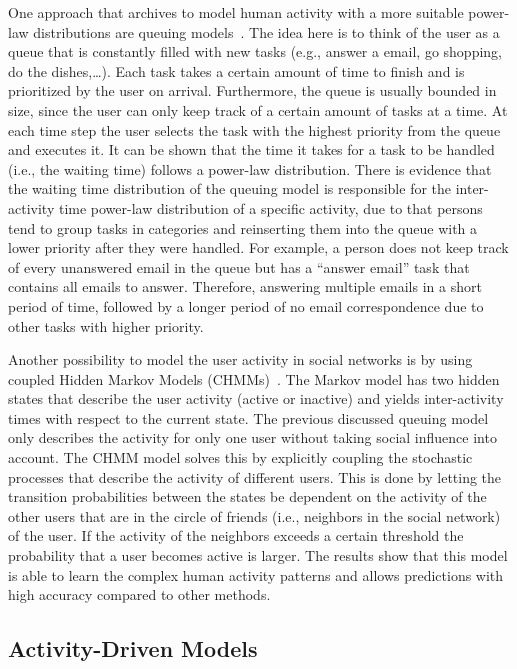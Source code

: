 One approach that archives to model human activity with a more suitable power-law distributions are queuing models~\cite{Vazquez2006}.
The idea here is to think of the user as a queue that is constantly filled with new tasks (e.g., answer a email, go shopping, do the dishes,\ldots).
Each task takes a certain amount of time to finish and is prioritized by the user on arrival.
Furthermore, the queue is usually bounded in size, since the user can only keep track of a certain amount of tasks at a time.
At each time step the user selects the task with the highest priority from the queue and executes it.
It can be shown that the time it takes for a task to be handled (i.e., the waiting time) follows a power-law distribution.
There is evidence that the waiting time distribution of the queuing model is responsible for the inter-activity time power-law distribution of a specific activity, due to that persons tend to group tasks in categories and reinserting them into the queue with a lower priority after they were handled.
For example, a person does not keep track of every unanswered email in the queue but has a \enquote{answer email} task that contains all emails to answer.
Therefore, answering multiple emails in a short period of time, followed by a longer period of no email correspondence due to other tasks with higher priority.

Another possibility to model the user activity in social networks is by using coupled Hidden Markov Models (CHMMs)~\cite{Raghavan2013}.
The Markov model has two hidden states that describe the user activity (active or inactive) and yields inter-activity times with respect to the current state.
The previous discussed queuing model only describes the activity for only one user without taking social influence into account.
   The CHMM model solves this by explicitly coupling the stochastic processes that describe the activity of different users.
   This is done by letting the transition probabilities between the states be dependent on the activity of the other users that are in the circle of friends (i.e., neighbors in the social network) of the user.
If the activity of the neighbors exceeds a certain threshold the probability that a user becomes active is larger.
The results show that this model is able to learn the complex human activity patterns and allows predictions with high accuracy compared to other methods.

\subsection{Activity-Driven Models}


